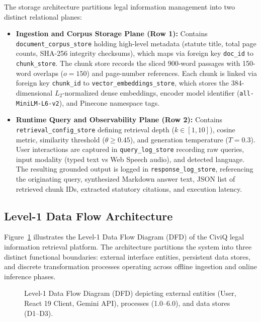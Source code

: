 \documentclass[12pt,a4paper]{report}
\begin{document}
The storage architecture partitions legal information management into two distinct relational planes:
\begin{itemize}
    \item \textbf{Ingestion and Corpus Storage Plane (Row 1):} Contains \texttt{document\_corpus\_store} holding high-level metadata (statute title, total page counts, SHA-256 integrity checksums), which maps via foreign key \texttt{doc\_id} to \texttt{chunk\_store}. The chunk store records the sliced 900-word passages with 150-word overlaps ($o=150$) and page-number references. Each chunk is linked via foreign key \texttt{chunk\_id} to \texttt{vector\_embeddings\_store}, which stores the 384-dimensional $L_2$-normalized dense embeddings, encoder model identifier (\texttt{all-MiniLM-L6-v2}), and Pinecone namespace tags.
    \item \textbf{Runtime Query and Observability Plane (Row 2):} Contains \texttt{retrieval\_config\_store} defining retrieval depth ($k \in [1, 10]$), cosine metric, similarity threshold ($\theta \ge 0.45$), and generation temperature ($T=0.3$). User interactions are captured in \texttt{query\_log\_store} recording raw queries, input modality (typed text vs Web Speech audio), and detected language. The resulting grounded output is logged in \texttt{response\_log\_store}, referencing the originating query, synthesized Markdown answer text, JSON list of retrieved chunk IDs, extracted statutory citations, and execution latency.
\end{itemize}

\subsection{Level-1 Data Flow Architecture}
Figure~\ref{fig:data_flow_diagram} illustrates the Level-1 Data Flow Diagram (DFD) of the CiviQ legal information retrieval platform. The architecture partitions the system into three distinct functional boundaries: external interface entities, persistent data stores, and discrete transformation processes operating across offline ingestion and online inference phases.

\begin{figure}[htbp]
    \centering
    \caption{Level-1 Data Flow Diagram (DFD) depicting external entities (User, React 19 Client, Gemini API), processes (1.0--6.0), and data stores (D1--D3).}
    \label{fig:data_flow_diagram}
\end{figure}
\end{document}

